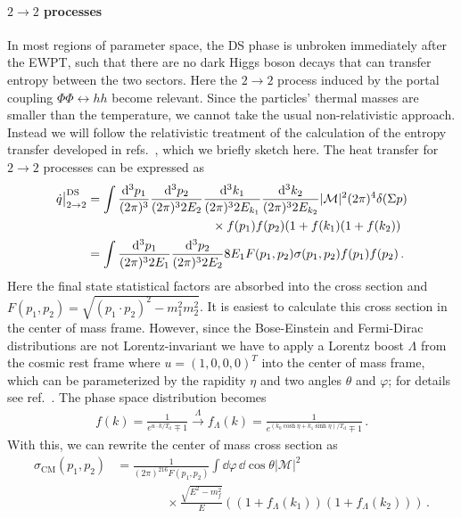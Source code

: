 \paragraph{$2\to 2$ processes}
\label{subsec:2to2processes}

In most regions of parameter space, the \ac{DS} phase is unbroken immediately after the \ac{EWPT}, such that there are no dark Higgs boson decays that can transfer entropy between the two sectors. Here the $2 \to 2 $ process induced by the portal coupling $\Phi\Phi \leftrightarrow hh$ become relevant. Since the particles'  thermal masses are smaller than the temperature, we cannot take the usual non-relativistic approach. Instead we will follow the relativistic treatment of the calculation of the entropy transfer developed in refs.~\cite{Arcadi:2019oxh,DeRomeri:2020wng}, which we briefly sketch here. The heat transfer for $2\to2$ processes can be expressed as 
\begin{align}\label{eq:entropy-22}
	\dot{q}\big|_{2\to2}^{\text{DS}} 
	&= \int \frac{\mathrm{d}^3p_1}{(2\pi)^{3}}\frac{\mathrm{d}^3p_2}{(2\pi)^{3}2E_{2}}\frac{\mathrm{d}^3k_1}{(2\pi)^{3}2E_{k_{1}}}
	\frac{\mathrm{d}^3k_2}{(2\pi)^{3}2E_{k_{2}}} |\mathcal{M}|^2 (2\pi)^4\delta(\Sigma p) \nonumber \\
	& ~~~~~~~~~~~~~~~~~~~~~~~~~~~~~~\times f(p_{1})f(p_2)(1+ f(k_{1}) (1+f(k_2)) \nonumber\\
	&= \int \frac{\mathrm{d}^3p_1}{(2\pi)^{3}2E_{1}}\frac{\mathrm{d}^3p_2}{(2\pi)^{3}2E_{2}} 8 E_{1} F(p_1, p_2) \sigma(p_1, p_2) f(p_1) f(p_2)\,.
\end{align}
Here the final state statistical factors are absorbed into the cross section and $F(p_{1}, p_{2}) = \sqrt{(p_1\cdot p_2)^2-m^2_{1}m_2^2}$. It is easiest to calculate this cross section in the center of mass frame. However, since the Bose-Einstein and Fermi-Dirac distributions are not Lorentz-invariant we have to apply a Lorentz boost $\Lambda$ from the cosmic rest frame where $u = (1, 0, 0, 0)^{T}$ into the center of mass frame, which can be parameterized by the rapidity $\eta$ and two angles $\theta$ and $\varphi$; for details see ref.~\cite{Arcadi:2019oxh}. The phase space distribution becomes
\begin{align}
	f(k) = \frac{1}{e^{u \cdot k/T_\text{d}} \mp 1} \overset{\Lambda}{\rightarrow} f_{\Lambda}(k) =
	\frac{1}{e^{\left( k_{0} \cosh\eta + k_{1}\sinh\eta  \right)/T_\text{d} }\mp 1}\,.
\end{align}
With this, we can rewrite the center of mass cross section as
\begin{align}
	\sigma_{\mathrm{CM}}(p_1,p_2) &= \frac{1}{(2\pi)^216F(p_1,p_2)}  \int \dd \varphi \, \dd \cos\theta \left| \mathcal{M} \right|^2 \nonumber \\ & \qquad \qquad  \times 
	\frac{\sqrt{E^2-m_{f}^2}}{E} \left( (1+f_{\Lambda}(k_1))(1+ f_{\Lambda}(k_2)) \right)\,.
\end{align}
